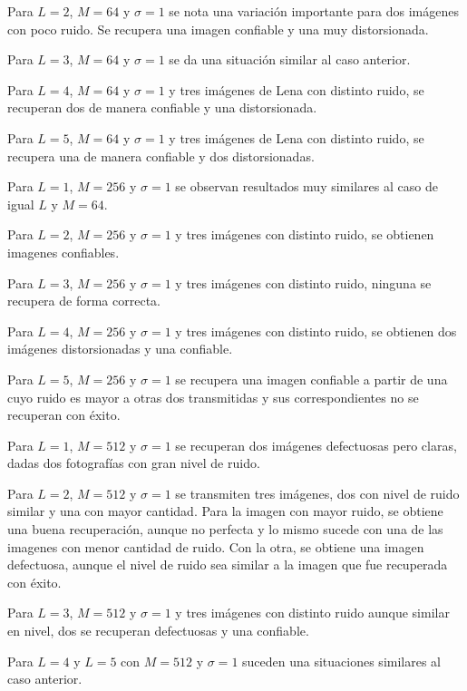 \documentclass[10pt,journal,compsoc]{IEEEtran}
\begin{document}
Para $L = {2}$, $M = {64}$ y $\sigma = 1$ se nota una variaci\'on importante para dos im\'agenes con poco ruido. Se recupera una imagen confiable y una muy distorsionada.

Para $L = {3}$, $M = {64}$ y $\sigma = 1$ se da una situaci\'on similar al caso anterior.

Para $L = {4}$, $M = {64}$ y $\sigma = 1$ y tres im\'agenes de Lena con distinto ruido, se recuperan dos de manera confiable y una distorsionada.

Para $L = {5}$, $M = {64}$ y $\sigma = 1$ y tres im\'agenes de Lena con distinto ruido, se recupera una de manera confiable y dos distorsionadas.

Para $L = {1}$, $M = {256}$ y $\sigma = 1$ se observan resultados muy similares al caso de igual $L$ y $M = {64}$.

Para $L = {2}$, $M = {256}$ y $\sigma = 1$ y tres im\'agenes con distinto ruido, se obtienen imagenes confiables.

Para $L = {3}$, $M = {256}$ y $\sigma = 1$ y tres im\'agenes con distinto ruido, ninguna se recupera de forma correcta.

Para $L = {4}$, $M = {256}$ y $\sigma = 1$ y tres im\'agenes con distinto ruido, se obtienen dos im\'agenes distorsionadas y una confiable.

Para $L = {5}$, $M = {256}$ y $\sigma = 1$ se recupera una imagen confiable a partir de una cuyo ruido es mayor a otras dos transmitidas y sus correspondientes no se recuperan con \'exito.

Para $L = {1}$, $M = {512}$ y $\sigma = 1$ se recuperan dos im\'agenes defectuosas pero claras, dadas dos fotograf\'ias con gran nivel de ruido.

Para $L = {2}$, $M = {512}$ y $\sigma = 1$ se transmiten tres im\'agenes, dos con nivel de ruido similar y una con mayor cantidad. Para la imagen con mayor ruido, se obtiene una buena recuperaci\'on, aunque no perfecta y lo mismo sucede con una de las imagenes con menor cantidad de ruido. Con la otra, se obtiene una imagen defectuosa, aunque el nivel de ruido sea similar a la imagen que fue recuperada con \'exito.

Para $L = {3}$, $M = {512}$ y $\sigma = 1$ y tres im\'agenes con distinto ruido aunque similar en nivel, dos se recuperan defectuosas y una confiable.

Para $L = {4}$ y $L = {5}$ con $M = {512}$ y $\sigma = 1$ suceden una situaciones similares al caso anterior.
\end{document}

